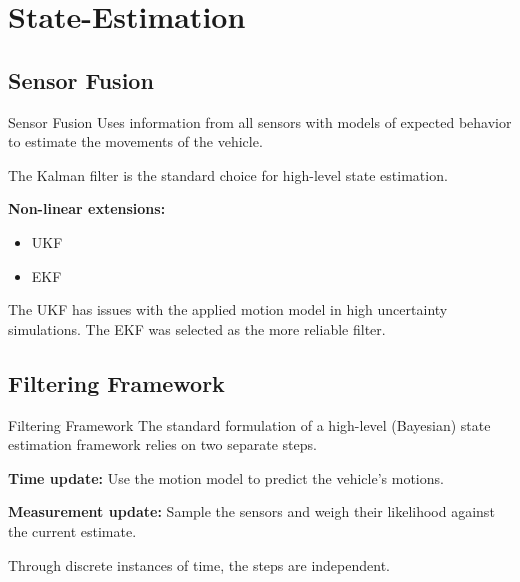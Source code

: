 \section{State-Estimation}
    \subsection{Sensor Fusion}
    \begin{frame}{Sensor Fusion}
        Uses information from all sensors with models of expected behavior
        to estimate the movements of the vehicle.

        The Kalman filter is the standard choice for high-level state estimation.

        \textbf{Non-linear extensions:}
        \begin{itemize}
            \item UKF
            \item EKF
        \end{itemize}
        The UKF has issues with the applied motion model in high uncertainty simulations.
        The EKF was selected as the more reliable filter.
    \end{frame}

    \subsection{Filtering Framework}
    \begin{frame}{Filtering Framework}
        The standard formulation of a high-level (Bayesian) state estimation framework
        relies on two separate steps.

        \vspace{0.5cm}

        \textbf{Time update: } Use the motion model to predict the vehicle's motions.

        \textbf{Measurement update: } Sample the sensors and weigh their likelihood against the current estimate.


        \vspace{0.5cm}
        Through discrete instances of time, the steps are independent.
    \end{frame}

